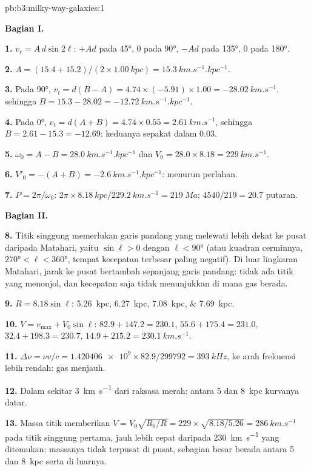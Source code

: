 \begin{solution}{pb:b3:milky-way-galaxies:1}

\textbf{Bagian I.}

\textbf{1.} $v_r = A\,d\sin2\ell$: $+A d$ pada \ang{45}, 0 pada \ang{90}, $-A d$ pada
\ang{135}, 0 pada \ang{180}.

\textbf{2.} $A = (15.4 + 15.2)/(2\times\qty{1.00}{kpc}) =
\qty{15.3}{km.s^{-1}.kpc^{-1}}$.

\textbf{3.} Pada \ang{90}, $v_t = d(B - A) = 4.74\times(-5.91)\times1.00 =
\qty{-28.02}{km.s^{-1}}$, sehingga $B = 15.3 - 28.02 =
\qty{-12.72}{km.s^{-1}.kpc^{-1}}$.

\textbf{4.} Pada \ang{0}, $v_t = d(A + B) = 4.74\times0.55 =
\qty{2.61}{km.s^{-1}}$, sehingga $B = 2.61 - 15.3 = \num{-12.69}$: keduanya
sepakat dalam \num{0.03}.

\textbf{5.} $\omega_0 = A - B = \qty{28.0}{km.s^{-1}.kpc^{-1}}$ dan
$V_0 = 28.0\times8.18 = \qty{229}{km.s^{-1}}$.

\textbf{6.} $V'_0 = -(A + B) = \qty{-2.6}{km.s^{-1}.kpc^{-1}}$: menurun perlahan.

\textbf{7.} $P = 2\pi/\omega_0$: $2\pi\times\qty{8.18}{kpc}/\qty{229.2}{km.s^{-1}}
= \qty{219}{Ma}$; $4540/219 = 20.7$ putaran.

\textbf{Bagian II.}

\textbf{8.} Titik singgung memerlukan garis pandang yang melewati lebih dekat ke
pusat daripada Matahari, yaitu $\sin\ell > 0$ dengan $\ell < \ang{90}$ (atau
kuadran cerminnya, $\ang{270} < \ell < \ang{360}$, tempat kecepatan terbesar
paling negatif). Di luar lingkaran Matahari, jarak ke pusat bertambah sepanjang
garis pandang: tidak ada titik yang menonjol, dan kecepatan saja tidak
menunjukkan di mana gas berada.

\textbf{9.} $R = 8.18\sin\ell$: \qtylist{5.26;6.27;7.08;7.69}{kpc}.

\textbf{10.} $V = v_\mathrm{max} + V_0\sin\ell$: $82.9 + 147.2 = 230.1$,
$55.6 + 175.4 = 231.0$, $32.4 + 198.3 = 230.7$, $14.9 + 215.2 =
\qty{230.1}{km.s^{-1}}$.

\textbf{11.} $\Delta\nu = \nu v/c = \num{1.420406e9}\times82.9/299792 =
\qty{393}{kHz}$, ke arah frekuensi lebih rendah: gas menjauh.

\textbf{12.} Dalam sekitar \qty{3}{km.s^{-1}} dari raksasa merah: antara 5 dan
\qty{8}{kpc} kurvanya datar.

\textbf{13.} Massa titik memberikan $V = V_0\sqrt{R_0/R} = 229\times\sqrt{8.18/5.26} =
\qty{286}{km.s^{-1}}$ pada titik singgung pertama, jauh lebih cepat daripada
\qty{230}{km.s^{-1}} yang ditemukan: massanya tidak terpusat di pusat,
sebagian besar berada antara 5 dan \qty{8}{kpc} serta di luarnya.


\end{solution}
